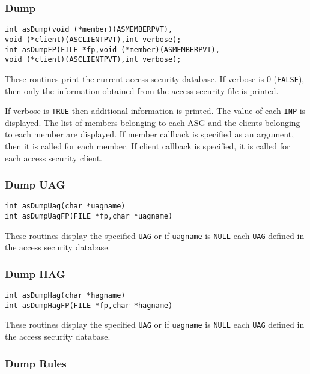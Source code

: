 \subsubsection{Dump}

\begin{verbatim}int asDump(void (*member)(ASMEMBERPVT),
void (*client)(ASCLIENTPVT),int verbose);
int asDumpFP(FILE *fp,void (*member)(ASMEMBERPVT),
void (*client)(ASCLIENTPVT),int verbose);
\end{verbatim}
These routines print the current access security database. If verbose is 0 (\verb|FALSE|), then only the information obtained 
from the access security file is printed.

If verbose is \verb|TRUE| then additional information is printed. The value of each \verb|INP| is displayed. The list of members 
belonging to each ASG and the clients belonging to each member are displayed. If member callback is specified as an 
argument, then it is called for each member. If client callback is specified, it is called for each access security client.

\subsubsection{Dump UAG}

\begin{verbatim}int asDumpUag(char *uagname)
int asDumpUagFP(FILE *fp,char *uagname)
\end{verbatim}
These routines display the specified \verb|UAG| or if \verb|uagname| is \verb|NULL| each \verb|UAG| defined in the access security database.

\subsubsection{Dump HAG}

\begin{verbatim}int asDumpHag(char *hagname)
int asDumpHagFP(FILE *fp,char *hagname)
\end{verbatim}
These routines display the specified \verb|UAG| or if \verb|uagname| is \verb|NULL| each \verb|UAG| defined in the access security database.

\subsubsection{Dump Rules}

